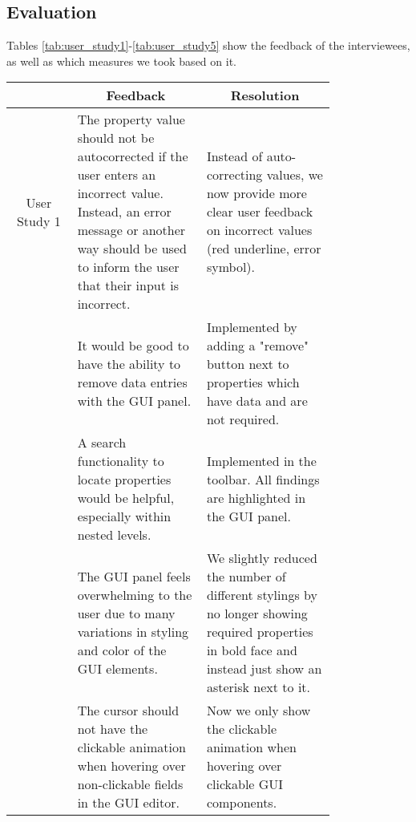 \subsection{Evaluation} %

Tables \ref{tab:user_study1}-\ref{tab:user_study5} show the feedback of the interviewees, as well as which measures we took based on it.
\begin{table*}
    \vspace{-10pt}
    \centering
    \small %
    \setlength{\extrarowheight}{5pt} %
    \renewcommand{\arraystretch}{1.5} %
    \begin{tabular}{|c|p{0.4\linewidth}|p{0.4\linewidth}|}
        \hline
        \multicolumn{1}{|c|}{} & \multicolumn{1}{|c|}{Feedback} & \multicolumn{1}{|c|}{Resolution} \\
        \cline{2-3}
        \hline
        User Study 1 & The property value should not be autocorrected if the user enters an incorrect value. 
        Instead, an error message or another way should be used to inform the user that their input is incorrect. & 
        Instead of auto-correcting values, we now provide more clear user feedback on incorrect values (red underline, error symbol). \\
        \cline{2-3}
        & It would be good to have the ability to remove data entries with the GUI panel. & 
        Implemented by adding a "remove" button next to properties which have data and are not required. \\
        \cline{2-3}
        & A search functionality to locate properties would be helpful, especially within nested levels.
        & Implemented in the toolbar. All findings are highlighted in the GUI panel. \\
        \cline{2-3}
        \cline{2-3}
        & The GUI panel feels overwhelming to the user due to many variations in styling and color of the GUI elements. & 
        We slightly reduced the number of different stylings by no longer showing required properties in bold face and instead just show an asterisk next to it. \\
        \cline{2-3}
        & The cursor should not have the clickable animation when hovering over non-clickable fields in the GUI editor. & Now we only show the clickable animation when hovering over clickable GUI components. \\

\end{tabular}
\end{table*}
